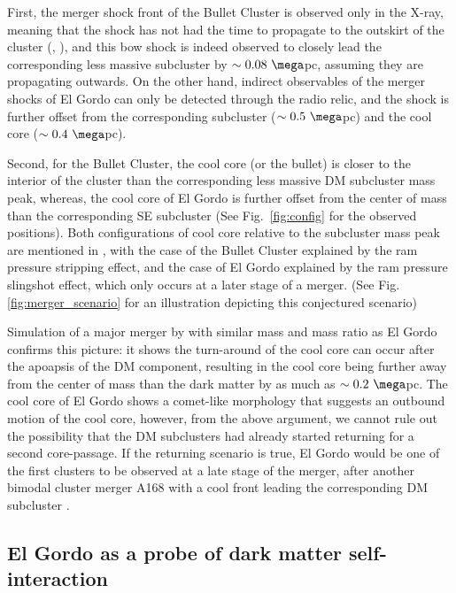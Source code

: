 First, the merger shock front of the Bullet Cluster is
observed only in the X-ray, meaning that the shock has not had the
time to propagate to the outskirt of the cluster (\citealt{Bruggen2011},
\citealt{Markevitch2007}), and this bow shock is indeed observed to closely
lead the corresponding less massive subcluster by $\sim 0.08~\mega$pc,
assuming they are propagating outwards. On the other hand, indirect observables of the merger
shocks of El Gordo can only be detected through the radio relic, and the shock is
further offset from the corresponding subcluster ($\sim 0.5~\mega$pc) and
the cool core ($\sim 0.4~\mega$pc). \par
Second, for the Bullet Cluster, the cool core (or the bullet) is closer to the
interior of the cluster than the corresponding less massive DM subcluster mass
peak, whereas, the cool core of El Gordo is further offset from the center of
mass than the corresponding SE subcluster (See Fig.~\ref{fig:config} for
the observed positions). 
Both configurations of cool core relative to the subcluster mass peak are
mentioned in \cite{Markevitch2007}, with the case of the Bullet Cluster
explained by the ram pressure stripping effect, and the case of El Gordo
explained by the ram pressure slingshot effect, which only occurs at a
later stage of a merger. (See Fig. \ref{fig:merger_scenario} for an
illustration depicting this conjectured scenario)\par 
Simulation of a major merger by
\cite{Mathis05} with similar mass and mass ratio as El Gordo confirms this
picture: it shows the turn-around of the cool core can occur after the
apoapsis of the DM component, resulting in the cool core being further
away from the center of mass than the dark matter by as much as $\sim
0.2~\mega$pc.  The cool core of El Gordo shows a comet-like
morphology that suggests an outbound motion of the cool core, however, from
the above argument, we cannot rule out the possibility that the DM
subclusters had already started returning for a second core-passage. 
If the returning scenario is true, El Gordo would be one of the first
clusters to be observed at a late stage of the merger, after another
bimodal cluster merger A168 with a cool front leading the corresponding DM
subcluster \citep{Hallman04}.

\subsection{El Gordo as a probe of dark matter self-interaction}

